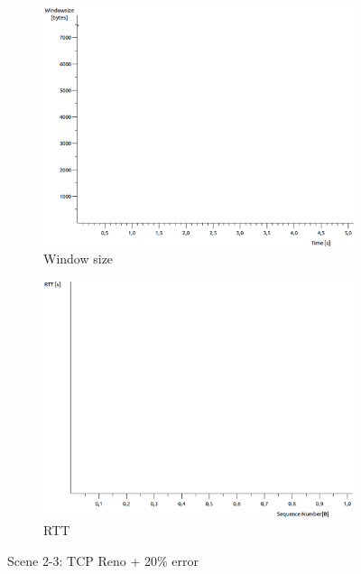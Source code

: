 \documentclass[conference,a4paper]{IEEEtran}
\begin{document}
\begin{figure}
\begin{subfigure}[b]{0.2\textwidth}
  \includegraphics[width=\textwidth]{s2-3_wnd}
  \caption{Window size}
 \end{subfigure}
 \begin{subfigure}[b]{0.2\textwidth}
  \includegraphics[width=\textwidth]{s2-3_rtt}
  \caption{RTT}
 \end{subfigure}
 \caption{Scene 2-3: TCP Reno + 20\% error}
\end{figure}
\end{document}
